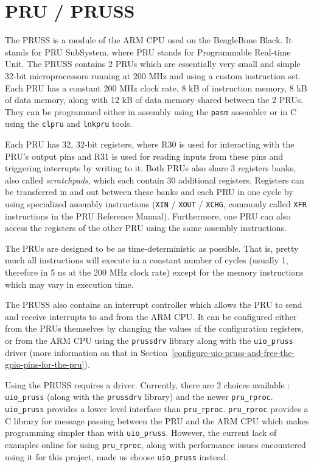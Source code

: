 \documentclass[]{report}
\begin{document}
\hypertarget{pru-pruss}{%
\section{PRU / PRUSS}\label{pru-pruss}}

The PRUSS is a module of the ARM CPU used on the BeagleBone Black. It stands for PRU SubSystem, where PRU stands for Programmable Real-time Unit. The PRUSS contains 2 PRUs which are essentially very small and simple 32-bit microprocessors running at 200 MHz and using a custom instruction set. Each PRU has a constant 200 MHz clock rate, 8 kB of instruction memory, 8 kB of data memory, along with 12 kB of data memory shared between the 2 PRUs. They can be programmed either in assembly using the \texttt{pasm} assembler or in C using the \texttt{clpru} and \texttt{lnkpru} tools.

Each PRU has 32, 32-bit registers, where R30 is used for interacting with the PRU's output pins and R31 is used for reading inputs from these pins and triggering interrupts by writing to it. Both PRUs also share 3 registers banks, also called \emph{scratchpads}, which each contain 30 additional registers. Registers can be transferred in and out between these banks and each PRU in one cycle by using specialized assembly instructions (\texttt{XIN} / \texttt{XOUT} / \texttt{XCHG}, commonly called \texttt{XFR} instructions in the PRU Reference Manual). Furthermore, one PRU can also access the registers of the other PRU using the same assembly instructions.

The PRUs are designed to be as time-deterministic as possible. That is, pretty much all instructions will execute in a constant number of cycles (usually 1, therefore in 5 ns at the 200 MHz clock rate) except for the memory instructions which may vary in execution time.

The PRUSS also contains an interrupt controller which allows the PRU to send and receive interrupts to and from the ARM CPU. It can be configured either from the PRUs themselves by changing the values of the configuration registers, or from the ARM CPU using the \texttt{prussdrv} library along with the \texttt{uio\_pruss} driver (more information on that in Section~\ref{configure-uio-pruss-and-free-the-gpio-pins-for-the-pru}).

Using the PRUSS requires a driver. Currently, there are 2 choices available : \texttt{uio\_pruss} (along with the \texttt{prussdrv} library) and the newer \texttt{pru\_rproc}. \texttt{uio\_pruss} provides a lower level interface than \texttt{pru\_rproc}. \texttt{pru\_rproc} provides a C library for message passing between the PRU and the ARM CPU which makes programming simpler than with \texttt{uio\_pruss}. However, the current lack of examples online for using \texttt{pru\_rproc}, along with performance issues encountered using it for this project, made us choose \texttt{uio\_pruss} instead.
\end{document}
